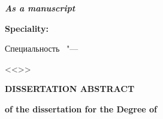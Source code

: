 \thispagestyle{empty}
\begin{center}
	\thesisOrganization
\end{center}

\vspace{0pt plus1fill} %
	\begin{flushright}
		\textit{\textbf{As a manuscript}}\\
	\end{flushright}

\vspace{0pt plus4fill} %
\begin{center}
\textbf { \thesisAuthor}
\end{center}

\vspace{0pt plus1fill} %
\begin{center}
\textbf { %
\thesisTitle}

\vspace{0pt plus1fill} %
\textbf {Speciality:} \textbf {\thesisSpecialtyNumber}\textbf {\thesisSpecialtyTitle}

\ifdefined\thesisSpecialtyTwoNumber
{ Специальность \thesisSpecialtyTwoNumber\ "---\par <<\thesisSpecialtyTwoTitle>>}
\fi

\vspace{0pt plus1.5fill} %
\textbf {{DISSERTATION ABSTRACT}}\par
\textbf {{of the dissertation for the Degree of}} \par \textbf { \thesisDegree}
\end{center}

